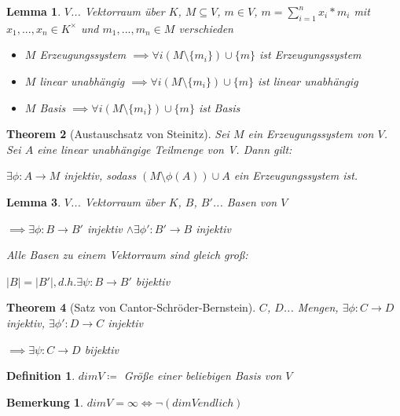 \documentclass[twocolumn]{article}
\newtheorem{theorem}{Theorem}[section]
\newtheorem{lemma}[theorem]{Lemma}
\newtheorem{definition}{Definition}[section]
\newtheorem*{remark}{Bemerkung}
\newcommand*{\logeq}{\Leftrightarrow}
\begin{document}
\begin{lemma}
	$V$... Vektorraum über $K$, $M \subseteq V$, $m \in V$, $m=\sum_{i=1}^{n}x_i*m_i$ mit $x_1,...,x_n \in K^{\times }$ und $m_1,...,m_n \in M$ verschieden
	
	\begin{itemize}
		\item $M$ Erzeugungssystem $\implies \forall i (M\setminus \{m_i\})\cup \{m\}$ ist Erzeugungssystem
		\item $M$ linear unabhängig $\implies \forall i (M \setminus \{m_i\})\cup \{m\}$ ist linear unabhängig
		\item $M$ Basis $\implies \forall i (M \setminus \{m_i\})\cup \{m\}$ ist Basis
	\end{itemize}
\end{lemma}

\begin{theorem}[Austauschsatz von Steinitz]
	Sei $M$ ein Erzeugungssystem von $V$. Sei $A$ eine linear unabhängige Teilmenge von V. Dann gilt:
	
	$\exists \phi : A \rightarrow M$ injektiv, sodass $(M\setminus \phi(A))\cup A$ ein Erzeugungssystem ist.
\end{theorem}

\begin{lemma}
	$V$... Vektorraum über $K$, $B$, $B'$... Basen von $V$
	
	$\implies \exists \phi: B \rightarrow B'$ injektiv $\land \exists \phi':B'\rightarrow B$ injektiv
	
	Alle Basen zu einem Vektorraum sind gleich groß:
	
	$|B| = |B'|, d.h. \exists \psi: B\rightarrow B'$ bijektiv
\end{lemma}

\begin{theorem}[Satz von Cantor-Schröder-Bernstein]
	$C$, $D$... Mengen, $\exists \phi : C\rightarrow D$ injektiv, $\exists \phi' : D \rightarrow C$ injektiv
	
	$\implies \exists \psi : C \rightarrow D$ bijektiv
\end{theorem}

\begin{definition}
	$dimV\coloneqq$ Größe einer beliebigen Basis von $V$
\end{definition}

\begin{remark}
	$dimV=\infty \logeq \neg(dimV endlich)$
\end{remark}
\end{document}
